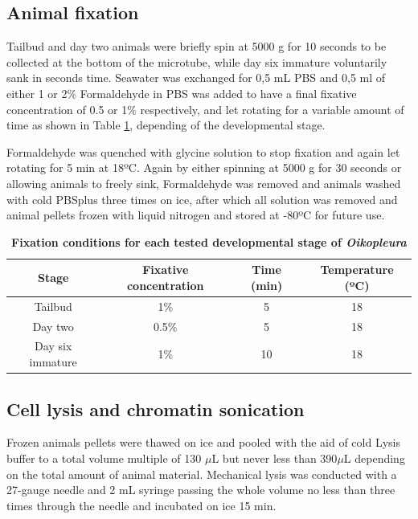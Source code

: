 \documentclass[11pt,twoside,a4paper]{report}
\begin{document}
		\subsection{Animal fixation}
			Tailbud and day two animals were briefly spin at 5000 g for 10 seconds to be collected at the bottom of the microtube, while day six immature voluntarily sank in seconds time. Seawater was exchanged for 0,5 mL PBS and 0,5 ml of either 1 or 2\% Formaldehyde in PBS was added to have a final fixative concentration of 0.5 or 1\% respectively, and let rotating for a variable amount of time as shown in Table \ref{table:ODfixation}, depending of the developmental stage.
			
			Formaldehyde was quenched with glycine solution to stop fixation and again let rotating for 5 min at 18ºC. 
			Again by either spinning at 5000 g for 30 seconds or allowing animals to freely sink, Formaldehyde was removed and animals washed with cold PBSplus three times on ice, after which all solution was removed and animal pellets frozen with liquid nitrogen and stored at -80ºC for future use.
    
    		 \begin{table}[!ht]
	    	    \caption{\bf{Fixation conditions for each tested developmental stage of \textit{Oikopleura}}}
        		\begin{center}
		            \begin{tabular}{c|c|c|c}
                		\textbf{Stage} & \textbf{Fixative concentration} & \textbf{Time (min)} & \textbf{Temperature (ºC)}\\
		                \hline
		                Tailbud & 1\% & 5 & 18\\
		                Day two & 0.5\% & 5 & 18\\
		                Day six immature & 1\% & 10 & 18\\
        		    \end{tabular}
		        \end{center}
        		\label{table:ODfixation}
		    \end{table}
    
    			\subsection{Cell lysis and chromatin sonication}
			Frozen animals pellets were thawed on ice and pooled with the aid of cold Lysis buffer to a total volume multiple of 130 $\mu$L but never less than 390$\mu$L depending on the total amount of animal material.		
			Mechanical lysis was conducted with a 27-gauge needle and 2 mL syringe passing the whole volume no less than three times through the needle and incubated on ice 15 min.
			
\end{document}

